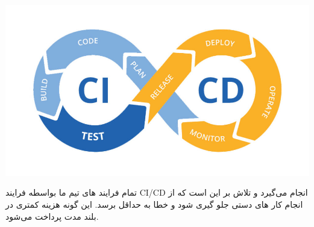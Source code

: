 \includegraphics[scale=0.6]{assets/cicd.jpg}

تمام فرایند های تیم ما بواسطه فرایند CI/CD انجام می‌گیرد و تلاش بر این است که از انجام کار های دستی جلو گیری شود و خطا به حداقل برسد.
این گونه هزینه کمتری در بلند مدت پرداخت می‌شود.

